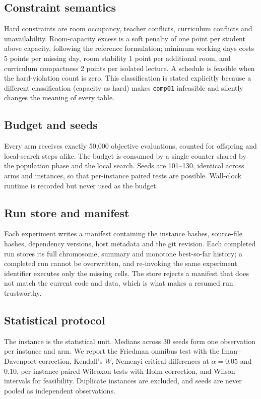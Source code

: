 \documentclass[journal]{IEEEtran}
\newcommand{\code}[1]{\texttt{#1}}
\begin{document}
\subsection{Constraint semantics}
Hard constraints are room occupancy, teacher conflicts, curriculum conflicts and unavailability. Room-capacity excess is a soft penalty of one point per student above capacity, following the reference formulation; minimum working days costs 5 points per missing day, room stability 1 point per additional room, and curriculum compactness 2 points per isolated lecture. A schedule is feasible when the hard-violation count is zero. This classification is stated explicitly because a different classification (capacity as hard) makes \code{comp01} infeasible and silently changes the meaning of every table.

\subsection{Budget and seeds}
Every arm receives exactly 50{,}000 objective evaluations, counted for offspring and local-search steps alike. The budget is consumed by a single counter shared by the population phase and the local search. Seeds are 101--130, identical across arms and instances, so that per-instance paired tests are possible. Wall-clock runtime is recorded but never used as the budget.

\subsection{Run store and manifest}
Each experiment writes a manifest containing the instance hashes, source-file hashes, dependency versions, host metadata and the git revision. Each completed run stores its full chromosome, summary and monotone best-so-far history; a completed run cannot be overwritten, and re-invoking the same experiment identifier executes only the missing cells. The store rejects a manifest that does not match the current code and data, which is what makes a resumed run trustworthy.

\subsection{Statistical protocol}
The instance is the statistical unit. Medians across 30 seeds form one observation per instance and arm. We report the Friedman omnibus test with the Iman--Davenport correction, Kendall's $W$, Nemenyi critical differences at $\alpha=0.05$ and $0.10$, per-instance paired Wilcoxon tests with Holm correction, and Wilson intervals for feasibility. Duplicate instances are excluded, and seeds are never pooled as independent observations.
\end{document}
